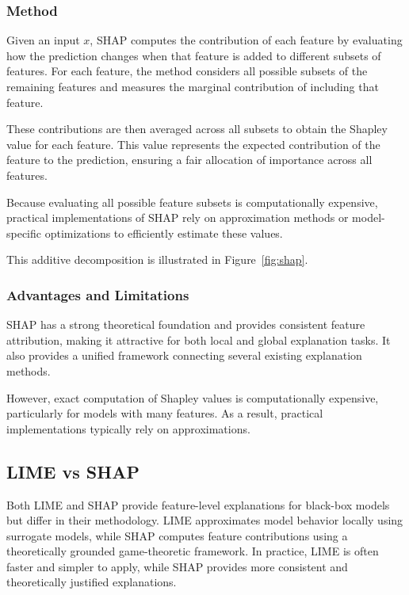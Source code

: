 \documentclass{article}
\begin{document}
\subsubsection{Method}

Given an input $x$, SHAP computes the contribution of each feature by evaluating how the prediction changes when that feature is added to different subsets of features. For each feature, the method considers all possible subsets of the remaining features and measures the marginal contribution of including that feature.

These contributions are then averaged across all subsets to obtain the Shapley value for each feature. This value represents the expected contribution of the feature to the prediction, ensuring a fair allocation of importance across all features.

Because evaluating all possible feature subsets is computationally expensive, practical implementations of SHAP rely on approximation methods or model-specific optimizations to efficiently estimate these values.

This additive decomposition is illustrated in Figure~\ref{fig:shap}.

\subsubsection{Advantages and Limitations}

SHAP has a strong theoretical foundation and provides consistent feature attribution, making it attractive for both local and global explanation tasks. It also provides a unified framework connecting several existing explanation methods.

However, exact computation of Shapley values is computationally expensive, particularly for models with many features. As a result, practical implementations typically rely on approximations.

\subsection{LIME vs SHAP}

Both LIME and SHAP provide feature-level explanations for black-box models but differ in their methodology. LIME approximates model behavior locally using surrogate models, while SHAP computes feature contributions using a theoretically grounded game-theoretic framework. In practice, LIME is often faster and simpler to apply, while SHAP provides more consistent and theoretically justified explanations.
\end{document}
